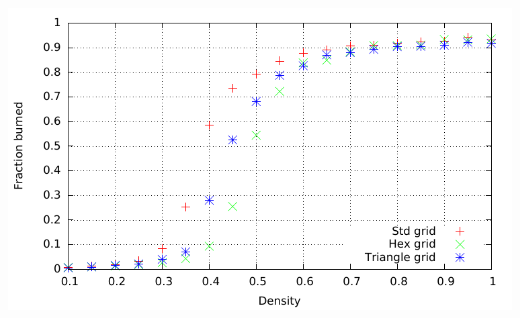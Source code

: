 \documentclass{article}
\newenvironment{Figure}
  {\par\medskip\noindent\minipage{\linewidth}}
  {\endminipage\par\medskip}
\begin{document}
\begin{multicols}{2}
\begin{Figure}
 \centering
 \includegraphics[width=\textwidth]{imgs/plot/ex6/fracburned.pdf}
\label{fig:ex6frac}
\end{Figure}

\end{multicols}
\end{document}
